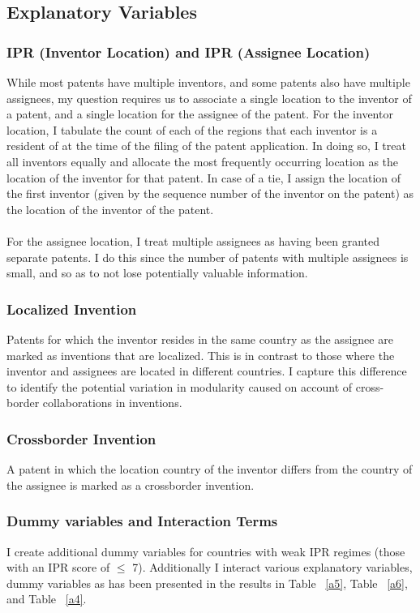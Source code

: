 \documentclass[12pt]{article}
\begin{document}
\subsection{Explanatory Variables}
\subsubsection{IPR (Inventor Location) and IPR (Assignee Location)}
While most patents have multiple inventors, and some patents also have multiple assignees, my question requires us to associate a single location to the inventor of a patent, and a single location for the assignee of the patent. For the inventor location, I tabulate the count of each of the regions that each inventor is a resident of at the time of the filing of the patent application. In doing so, I treat all inventors equally and allocate the most frequently occurring location as the location of the inventor for that patent. In case of a tie, I assign the location of the first inventor (given by the sequence number of the inventor on the patent) as the location of the inventor of the patent. 
\\\\
For the assignee location, I treat multiple assignees as having been granted separate patents. I do this since the number of patents with multiple assignees is small, and so as to not lose potentially valuable information.

\subsubsection{Localized Invention}
Patents for which the inventor resides in the same country as the assignee are marked as inventions that are localized. This is in contrast to those where the inventor and assignees are located in different countries. I capture this difference to identify the potential variation in modularity caused on account of cross-border collaborations in inventions. 

\subsubsection{Crossborder Invention}
A patent in which the location country of the inventor differs from the country of the assignee is marked as a crossborder invention.

\subsubsection{Dummy variables and Interaction Terms}
I create additional dummy variables for countries with weak IPR regimes (those with an IPR score of $\leq$ 7). Additionally I interact various explanatory variables, dummy variables as has been presented in the results in Table ~\ref{a5}, Table ~\ref{a6}, and Table ~\ref{a4}.

\end{document}
